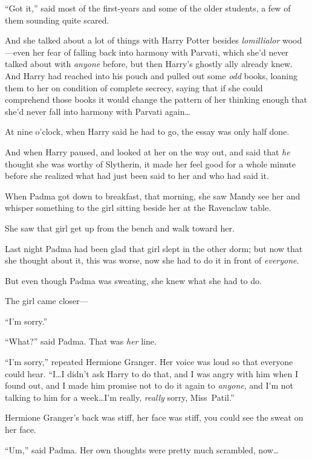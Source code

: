 “Got it,” said most of the first-years and some of the older students, a few of them sounding quite scared.

\later

And she talked about a lot of things with Harry Potter besides
\emph{lomillialor} wood—even her fear of falling back into harmony with Parvati, which she’d never talked about with \emph{anyone} before, but then Harry’s ghostly ally already knew. And Harry had reached into his pouch and pulled out some \emph{odd} books, loaning them to her on condition of complete secrecy, saying that if she could comprehend those books it would change the pattern of her thinking enough that she’d never fall into harmony with Parvati again…

At nine o’clock, when Harry said he had to go, the essay was only half done.

And when Harry paused, and looked at her on the way out, and said that \emph{he} thought she was worthy of Slytherin, it made her feel good for a whole minute before she realized what had just been said to her and who had said it.

\later

When Padma got down to breakfast, that morning, she saw Mandy see her and whisper something to the girl sitting beside her at the Ravenclaw table.

She saw that girl get up from the bench and walk toward her.

Last night Padma had been glad that girl slept in the other dorm; but now that she thought about it, this was worse, now she had to do it in front of \emph{everyone}.

But even though Padma was sweating, she knew what she had to do.

The girl came closer—

“I’m sorry.”

“What?” said Padma. That was \emph{her} line.

“I’m sorry,” repeated Hermione Granger. Her voice was loud so that everyone could hear. “I…I didn’t ask Harry to do that, and I was angry with him when I found out, and I made him promise not to do it again to \emph{anyone}, and I’m not talking to him for a week…I’m really, \emph{really} sorry, Miss~Patil.”

Hermione Granger’s back was stiff, her face was stiff, you could see the sweat on her face.

“Um,” said Padma. Her own thoughts were pretty much scrambled, now…

